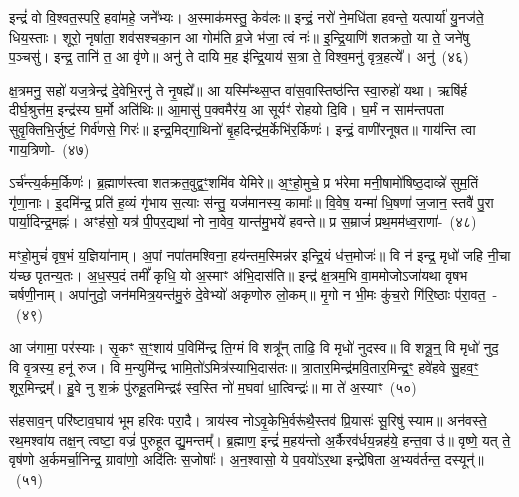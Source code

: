 {\anuvakamend[{प्र॒ति॒ष्ठाम॑ह्व॒दस्तु॑ वि॒द्युतं॑ वस॒न्तमे॒वेन्द्र॑स्या॒\-ऽष्टात्रिꣳ॑शच्च}]}%

इन्द्रं॑ वो वि॒श्वत॒स्परि॒ हवा॑महे॒ जने᳚भ्यः। अ॒स्माक॑मस्तु॒ केव॑लः॥ इन्द्रं॒ नरो॑ ने॒मधि॑ता हवन्ते॒ यत्पार्या॑ यु॒नज॑ते॒ धिय॒स्ताः। शूरो॒ नृषा॑ता॒ शव॑सश्चका॒न आ गोम॑ति व्र॒जे भ॑जा॒ त्वं नः॑॥ इ॒न्द्रि॒याणि॑ शतक्रतो॒ या ते॒ जने॑षु प॒ञ्चसु॑। इन्द्र॒ तानि॑ त॒ आ वृ॑णे॥ अनु॑ ते दायि म॒ह इ॑न्द्रि॒याय॑ स॒त्रा ते॒ विश्व॒मनु॑ वृत्र॒हत्ये᳚। अनु॑~(४६)

क्ष॒त्रमनु॒ सहो॑ यज॒त्रेन्द्र॑ दे॒वेभि॒रनु॑ ते नृ॒षह्ये᳚॥ आ यस्मि᳚न्थ्स॒प्त वा॑स॒वास्तिष्ठ॑न्ति स्वा॒रुहो॑ यथा। ऋषि॑र्\mbox{}ह दीर्घ॒श्रुत्त॑म॒ इन्द्र॑स्य घ॒र्मो अति॑थिः॥ आ॒मासु॑ प॒क्वमैर॑य॒ आ सूर्यꣳ॑ रोहयो दि॒वि। घ॒र्मं न साम॑न्तपता सुवृ॒क्तिभि॒र्जुष्टं॒ गिर्व॑णसे॒ गिरः॑॥ इन्द्र॒मिद्गा॒थिनो॑ बृ॒हदिन्द्र॑म॒र्केभि॑र॒र्किणः॑। इन्द्रं॒ वाणी॑रनूषत॥ गाय॑न्ति त्वा \mbox{गाय॒त्रिणो-~(४७)}

ऽर्च॑न्त्य॒र्कम॒र्किणः॑। ब्र॒ह्माण॑स्त्वा शतक्रत॒वुद्व॒ꣳ॒शमि॑व येमिरे॥ अ॒ꣳ॒हो॒मुचे॒ प्र भ॑रेमा मनी॒षामो॑षिष्ठ॒दाव्न्ने॑ सुम॒तिं गृ॑णा॒नाः। इ॒दमि॑न्द्र॒ प्रति॑ ह॒व्यं गृ॑भाय स॒त्याः स॑न्तु॒ यज॑मानस्य॒ कामाः᳚॥ वि॒वेष॒ यन्मा॑ धि॒षणा॑ ज॒जान॒ स्तवै॑ पु॒रा पार्या॒दिन्द्र॒मह्नः॑। अꣳह॑सो॒ यत्र॑ पी॒पर॒द्यथा॑ नो ना॒वेव॒ यान्त॑मु॒भये॑ हवन्ते॥ प्र स॒म्राजं॑ प्रथ॒मम॑ध्व॒राणा॑-~(४८)

मꣳहो॒मुचं॑ वृष॒भं य॒ज्ञिया॑नाम्। अ॒पां नपा॑तमश्विना॒ हय॑न्तम॒स्मिन्न॑र इन्द्रि॒यं ध॑त्त॒मोजः॑॥ वि न॑ इन्द्र॒ मृधो॑ जहि नी॒चा य॑च्छ पृतन्य॒तः। अ॒ध॒स्प॒दं तमीं᳚ कृधि॒ यो अ॒स्माꣳ अ॑भि॒दास॑ति॥ इन्द्र॑ क्ष॒त्रम॒भि वा॒ममोजो\-ऽजा॑यथा वृषभ चर्\mbox{}षणी॒नाम्। अपा॑नुदो॒ जन॑ममित्र॒यन्त॑मु॒रुं दे॒वेभ्यो॑ अकृणोरु लो॒कम्॥ मृ॒गो न भी॒मः कु॑च॒रो गि॑रि॒ष्ठाः प॑रा॒वत॒~-~(४९)

आ ज॑गामा॒ पर॑स्याः। सृ॒कꣳ स॒ꣳ॒शाय॑ प॒विमि॑न्द्र ति॒ग्मं वि शत्रू᳚न् ताढि॒ वि मृधो॑ नुदस्व॥ वि शत्रू॒न्॒ वि मृधो॑ नुद॒ वि वृ॒त्रस्य॒ हनू॑ रुज। वि म॒न्युमि॑न्द्र भामि॒तो॑\-ऽमित्र॑स्याभि॒दास॑तः॥ त्रा॒तार॒मिन्द्र॑मवि॒तार॒मिन्द्र॒ꣳ॒ हवे॑हवे सु॒हव॒ꣳ॒ शूर॒मिन्द्रम्᳚। हु॒वे नु श॒क्रं पु॑रुहू॒तमिन्द्रꣴ॑ स्व॒स्ति नो॑ म॒घवा॑ धा॒त्विन्द्रः॑॥ मा ते॑ अ॒स्याꣳ~(५०)

स॑हसाव॒न् परि॑ष्टाव॒घाय॑ भूम हरिवः परा॒दै। त्राय॑स्व नो\-ऽवृ॒केभि॒र्वरू॑थै॒स्तव॑ प्रि॒यासः॑ सू॒रिषु॑ स्याम॥ अन॑वस्ते॒ रथ॒मश्वा॑य तक्ष॒न् त्वष्टा॒ वज्रं॑ पुरुहूत द्यु॒मन्तम्᳚। ब्र॒ह्माण॒ इन्द्रं॑ म॒हय॑न्तो अ॒र्कैरव॑र्धय॒न्नह॑ये॒ हन्त॒वा उ॑॥ वृष्णे॒ यत् ते॒ वृष॑णो अ॒र्कमर्चा॒निन्द्र॒ ग्रावा॑णो॒ अदि॑तिः स॒जोषाः᳚। अ॒न॒श्वासो॒ ये प॒वयो॑\-ऽर॒था इन्द्रे॑षिता अ॒भ्यव॑र्तन्त॒ दस्यून्॑॥~(५१)

